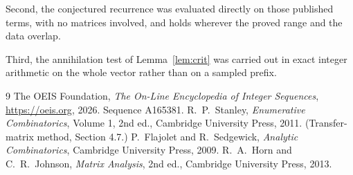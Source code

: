 \documentclass[11pt,a4paper]{article}
\theoremstyle{plain}
\theoremstyle{definition}
\begin{document}
Second, the conjectured recurrence was evaluated directly on those published terms, with no
matrices involved, and holds wherever the proved range and the data overlap.

Third, the annihilation test of Lemma~\ref{lem:crit} was carried out in exact integer
arithmetic on the whole vector rather than on a sampled prefix.

\begin{thebibliography}{9}
 The OEIS Foundation, \emph{The On-Line Encyclopedia of Integer
Sequences}, \url{https://oeis.org}, 2026. Sequence A165381.
 R.~P.~Stanley, \emph{Enumerative Combinatorics}, Volume 1, 2nd ed.,
Cambridge University Press, 2011. (Transfer-matrix method, Section 4.7.)
 P.~Flajolet and R.~Sedgewick, \emph{Analytic Combinatorics}, Cambridge
University Press, 2009.
 R.~A.~Horn and C.~R.~Johnson, \emph{Matrix Analysis}, 2nd ed., Cambridge
University Press, 2013.
\end{thebibliography}
\end{document}
